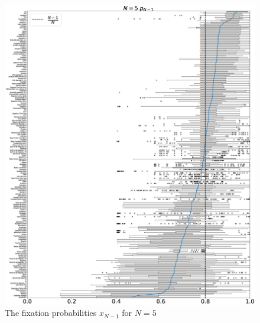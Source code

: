 \documentclass[10pt,letterpaper]{article}
\begin{document}
\begin{figure}[!hbtp]
    \centering
    \includegraphics[draft, width=\textwidth]{./Fig27.eps}
    \caption{The fixation probabilities \(x_{N-1}\) for \(N=5\)}
\end{figure}
\end{document}
